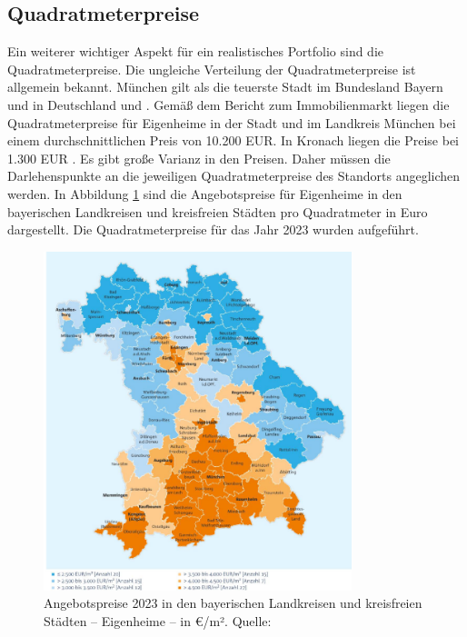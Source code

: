 \subsection{Quadratmeterpreise}
Ein weiterer wichtiger Aspekt für ein realistisches Portfolio sind die Quadratmeterpreise. Die ungleiche Verteilung der Quadratmeterpreise ist allgemein bekannt. München gilt als die teuerste Stadt im Bundesland Bayern und in Deutschland und . Gemäß dem Bericht zum Immobilienmarkt liegen die Quadratmeterpreise für Eigenheime in der Stadt und im Landkreis München bei einem durchschnittlichen Preis von 10.200 EUR. In Kronach liegen die Preise bei 1.300 EUR \parencite{bayernlabo2024}. Es gibt große Varianz in den Preisen. Daher müssen die Darlehenspunkte an die jeweiligen Quadratmeterpreise des Standorts angeglichen werden. In Abbildung \ref{fig:preis} sind die Angebotspreise für Eigenheime in den bayerischen Landkreisen und kreisfreien Städten pro Quadratmeter in Euro dargestellt. Die Quadratmeterpreise für das Jahr 2023 wurden aufgeführt.
\begin{figure}[htbp]
    \centering
    \includegraphics[width=0.8\textwidth]{figures/preism2.png}
    \caption{Angebotspreise 2023 in den bayerischen Landkreisen und kreisfreien Städten – Eigenheime – in €/m². Quelle: \textcite{bayernlabo2024} }
    \label{fig:preis}
\end{figure}
\FloatBarrier